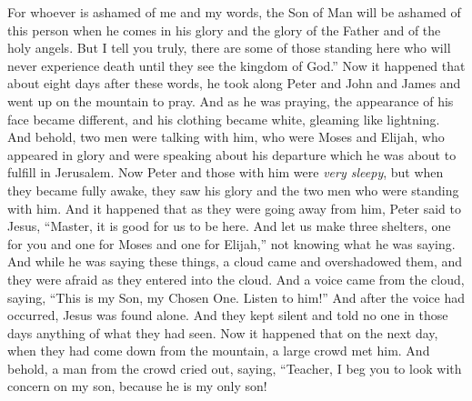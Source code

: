 \begin{biblechapter}
\verse For whoever is ashamed of me and my words, the Son of Man will be ashamed of this person when he comes in his glory and the glory of the Father and of the holy angels.
\verse But I tell you truly, there are some of those standing here who will never experience death until they see the kingdom of God.”
 Now it happened that about eight days after these words, he took along Peter and John and James and went up on the mountain to pray.
\verse And as he was praying, the appearance of his face became different, and his clothing became white, gleaming like lightning.
\verse And behold, two men were talking with him, who were Moses and Elijah,
\verse who appeared in glory and were speaking about his departure which he was about to fulfill in Jerusalem.
\verse Now Peter and those with him were \textit{very sleepy}, but when they became fully awake, they saw his glory and the two men who were standing with him.
\verse And it happened that as they were going away from him, Peter said to Jesus, “Master, it is good for us to be here. And let us make three shelters, one for you and one for Moses and one for Elijah,” not knowing what he was saying.
\verse And while he was saying these things, a cloud came and overshadowed them, and they were afraid as they entered into the cloud.
\verse And a voice came from the cloud, saying, “This is my Son, my Chosen One. Listen to him!”
\verse And after the voice had occurred, Jesus was found alone. And they kept silent and told no one in those days anything of what they had seen.
 Now it happened that on the next day, when they had come down from the mountain, a large crowd met him.
\verse And behold, a man from the crowd cried out, saying, “Teacher, I beg you to look with concern on my son, because he is my only son!

\end{biblechapter}
